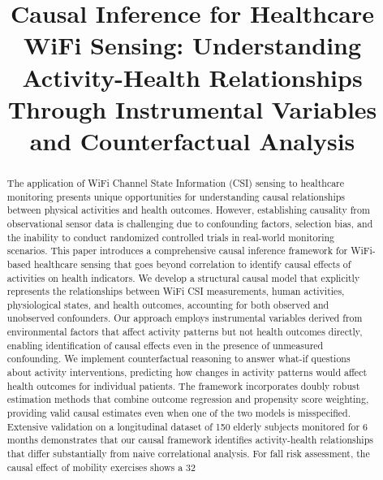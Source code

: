 \documentclass[journal]{IEEEtran}
\begin{document}
\title{Causal Inference for Healthcare WiFi Sensing: Understanding Activity-Health Relationships Through Instrumental Variables and Counterfactual Analysis}

\author{
}

\maketitle

\begin{abstract}
The application of WiFi Channel State Information (CSI) sensing to healthcare monitoring presents unique opportunities for understanding causal relationships between physical activities and health outcomes. However, establishing causality from observational sensor data is challenging due to confounding factors, selection bias, and the inability to conduct randomized controlled trials in real-world monitoring scenarios. This paper introduces a comprehensive causal inference framework for WiFi-based healthcare sensing that goes beyond correlation to identify causal effects of activities on health indicators. We develop a structural causal model that explicitly represents the relationships between WiFi CSI measurements, human activities, physiological states, and health outcomes, accounting for both observed and unobserved confounders. Our approach employs instrumental variables derived from environmental factors that affect activity patterns but not health outcomes directly, enabling identification of causal effects even in the presence of unmeasured confounding. We implement counterfactual reasoning to answer what-if questions about activity interventions, predicting how changes in activity patterns would affect health outcomes for individual patients. The framework incorporates doubly robust estimation methods that combine outcome regression and propensity score weighting, providing valid causal estimates even when one of the two models is misspecified. Extensive validation on a longitudinal dataset of 150 elderly subjects monitored for 6 months demonstrates that our causal framework identifies activity-health relationships that differ substantially from naive correlational analysis. For fall risk assessment, the causal effect of mobility exercises shows a 32%
\end{abstract}
\end{document}
